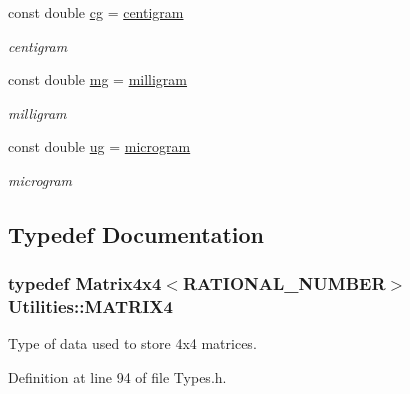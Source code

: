 \begin{DoxyCompactItemize}
const double \hyperlink{namespace_utilities_a8657e04ecc892b1e9a3b84db62bf94df}{cg} = \hyperlink{namespace_utilities_ae4b25dba2b30ec640f00b47acb80ff34}{centigram}
\begin{DoxyCompactList}\small\item\em centigram \end{DoxyCompactList}\item 
const double \hyperlink{namespace_utilities_a644a781a973f0febf71abf06c267c8f3}{mg} = \hyperlink{namespace_utilities_acad791e8ae3f5eb81fa1aeb7abf90f9f}{milligram}
\begin{DoxyCompactList}\small\item\em milligram \end{DoxyCompactList}\item 
const double \hyperlink{namespace_utilities_ab7041baaaea73a172ddc834aaea10ec1}{ug} = \hyperlink{namespace_utilities_ab9752f0a0b8174ed273a2a505c2a83e4}{microgram}
\begin{DoxyCompactList}\small\item\em microgram \end{DoxyCompactList}\end{DoxyCompactItemize}


\subsection{Typedef Documentation}
\hypertarget{namespace_utilities_a1e64fcb5d60661c7b2a3a5e7c96cc09f}{
\subsubsection[{MATRIX4}]{\setlength{\rightskip}{0pt plus 5cm}typedef {\bf Matrix4x4}$<${\bf RATIONAL\_\-NUMBER}$>$ {\bf Utilities::MATRIX4}}}
\label{namespace_utilities_a1e64fcb5d60661c7b2a3a5e7c96cc09f}


Type of data used to store 4x4 matrices. 



Definition at line 94 of file Types.h.

\hypertarget{namespace_utilities_a1f0db90cea8d87567b4dd719ffd7d274}{
\subsubsection[{Matrix4x4d}]{}}
\label{namespace_utilities_a1f0db90cea8d87567b4dd719ffd7d274}


